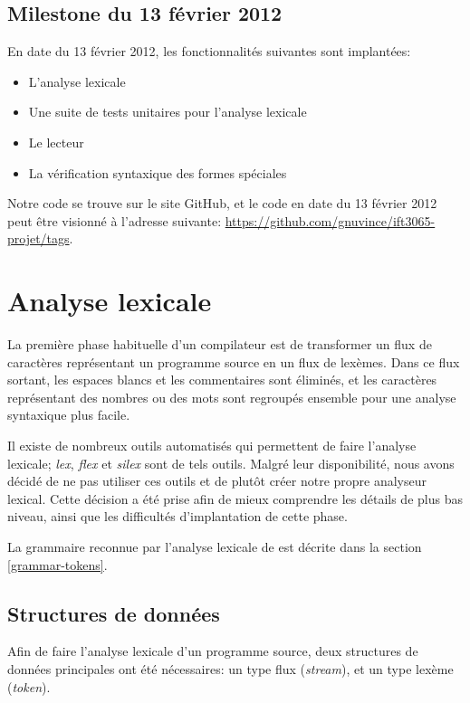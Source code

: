 \documentclass[11pt]{report}
\begin{document}
\section{Milestone du 13 février 2012}

En date du 13 février 2012, les fonctionnalités suivantes sont
implantées:

\begin{itemize}
\item L'analyse lexicale
\item Une suite de tests unitaires pour l'analyse lexicale
\item Le lecteur
\item La vérification syntaxique des formes spéciales
\end{itemize}

Notre code se trouve sur le site GitHub, et le code en date du 13
février 2012 peut être visionné à l'adresse suivante:
\url{https://github.com/gnuvince/ift3065-projet/tags}.


\chapter{Analyse lexicale}

La première phase habituelle d'un compilateur est de transformer un
flux de caractères représentant un programme source en un flux de
lexèmes.  Dans ce flux sortant, les espaces blancs et les commentaires
sont éliminés, et les caractères représentant des nombres ou des mots
sont regroupés ensemble pour une analyse syntaxique plus facile.

Il existe de nombreux outils automatisés qui permettent de faire
l'analyse lexicale; \emph{lex}, \emph{flex} et \emph{silex} sont de
tels outils.  Malgré leur disponibilité, nous avons décidé de ne pas
utiliser ces outils et de plutôt créer notre propre analyseur lexical.
Cette décision a été prise afin de mieux comprendre les détails de
plus bas niveau, ainsi que les difficultés d'implantation de cette
phase.

La grammaire reconnue par l'analyse lexicale de \sins{} est décrite
dans la section \ref{grammar-tokens}.

\section{Structures de données}

Afin de faire l'analyse lexicale d'un programme source, deux
structures de données principales ont été nécessaires: un type flux
(\emph{stream}), et un type lexème (\emph{token}).
\end{document}
